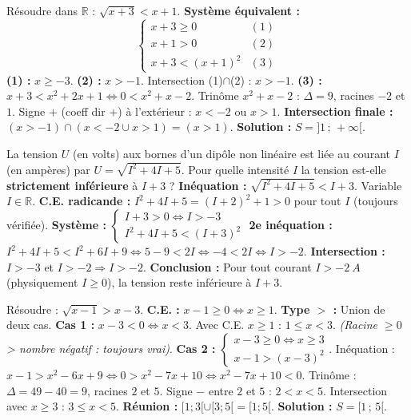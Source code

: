\documentclass[11pt]{article}
\begin{document}
\begin{exoresolu}
Résoudre dans $\mathbb{R}$ : $\sqrt{x+3}<x+1$.
\tcblower
\textbf{Système équivalent :}
\[\begin{cases} x+3\geq 0 & (1) \\ x+1>0 & (2) \\ x+3 < (x+1)^2 & (3) \end{cases}\]
\textbf{(1) :} $x\geq -3$.
\textbf{(2) :} $x > -1$. Intersection (1)$\cap$(2) : $x > -1$.
\textbf{(3) :} $x+3 < x^2+2x+1 \iff 0 < x^2+x-2$.
Trinôme $x^2+x-2$ : $\Delta=9$, racines $-2$ et $1$. Signe $+$ (coeff dir $+$) à l'extérieur : $x<-2$ ou $x>1$.
\textbf{Intersection finale :} $(x>-1) \cap (x<-2 \cup x>1) = (x>1)$.
\textbf{Solution :} $S=]1\,;\,+\infty[$.
\end{exoresolu}

\begin{exoresolu}
La tension $U$ (en volts) aux bornes d'un dipôle non linéaire est liée au courant $I$ (en ampères) par $U=\sqrt{I^2+4I+5}$. Pour quelle intensité $I$ la tension est-elle \textbf{strictement inférieure} à $I+3$ ?
\tcblower
\textbf{Inéquation :} $\sqrt{I^2+4I+5} < I+3$. Variable $I\in\mathbb{R}$.
\textbf{C.E. radicande :} $I^2+4I+5 = (I+2)^2+1 > 0$ pour tout $I$ (toujours vérifiée).
\textbf{Système :} $\begin{cases} I+3 > 0 \iff I > -3 \\ I^2+4I+5 < (I+3)^2 \end{cases}$
\textbf{2e inéquation :} $I^2+4I+5 < I^2+6I+9 \iff 5-9 < 2I \iff -4 < 2I \iff I > -2$.
\textbf{Intersection :} $I > -3$ et $I > -2 \Rightarrow I > -2$.
\textbf{Conclusion :} Pour tout courant $I > \SI{-2}{A}$ (physiquement $I\geq 0$), la tension reste inférieure à $I+3$.
\end{exoresolu}

\begin{exoresolu}
Résoudre : $\sqrt{x-1} > x-3$.
\tcblower
\textbf{C.E. :} $x-1\geq 0 \iff x\geq 1$.
\textbf{Type $>$ :} Union de deux cas.
\textbf{Cas 1 :} $x-3 < 0 \iff x < 3$. Avec C.E. $x\geq 1$ : $1\leq x < 3$. \textit{(Racine $\geq 0$ > nombre négatif : toujours vrai)}.
\textbf{Cas 2 :} $\begin{cases} x-3 \geq 0 \iff x\geq 3 \\ x-1 > (x-3)^2 \end{cases}$.
Inéquation : $x-1 > x^2-6x+9 \iff 0 > x^2-7x+10 \iff x^2-7x+10 < 0$.
Trinôme : $\Delta=49-40=9$, racines $2$ et $5$. Signe $-$ entre $2$ et $5$ : $2<x<5$.
Intersection avec $x\geq 3$ : $3\leq x < 5$.
\textbf{Réunion :} $[1;3[ \cup [3;5[ = [1;5[$.
\textbf{Solution :} $S=[1\,;\,5[$.
\end{exoresolu}
\end{document}
